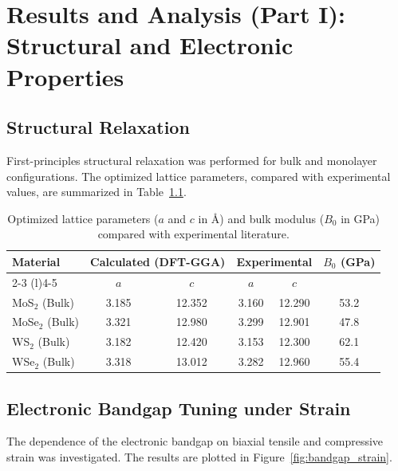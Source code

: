 \chapter{Results and Analysis (Part I): Structural and Electronic Properties}
\label{ch:results_1}

\section{Structural Relaxation}
First-principles structural relaxation was performed for bulk and monolayer configurations. The optimized lattice parameters, compared with experimental values, are summarized in Table~\ref{tab:structural_relax}.

\begin{table}[htbp]
    \centering
    \caption{Optimized lattice parameters ($a$ and $c$ in \si{\angstrom}) and bulk modulus ($B_0$ in \si{\giga\pascal}) compared with experimental literature.}
    \label{tab:structural_relax}
    \begin{tabular}{l c c c c c}
        \toprule
        \multirow{2}{*}{\textbf{Material}} & \multicolumn{2}{c}{\textbf{Calculated (DFT-GGA)}} & \multicolumn{2}{c}{\textbf{Experimental}} & \multirow{2}{*}{$B_0$ (GPa)} \\
        \cmidrule(r){2-3} \cmidrule(l){4-5}
        & $a$ & $c$ & $a$ & $c$ & \\
        \midrule
        MoS$_2$ (Bulk)  & 3.185 & 12.352 & 3.160 & 12.290 & 53.2 \\
        MoSe$_2$ (Bulk) & 3.321 & 12.980 & 3.299 & 12.901 & 47.8 \\
        WS$_2$ (Bulk)   & 3.182 & 12.420 & 3.153 & 12.300 & 62.1 \\
        WSe$_2$ (Bulk)  & 3.318 & 13.012 & 3.282 & 12.960 & 55.4 \\
        \bottomrule
    \end{tabular}
\end{table}

\section{Electronic Bandgap Tuning under Strain}
The dependence of the electronic bandgap on biaxial tensile and compressive strain was investigated. The results are plotted in Figure~\ref{fig:bandgap_strain}.

